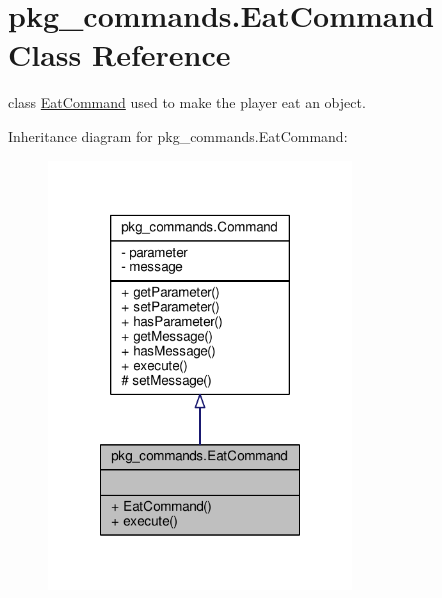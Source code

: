 \hypertarget{classpkg__commands_1_1EatCommand}{\section{pkg\-\_\-commands.\-Eat\-Command Class Reference}
\label{classpkg__commands_1_1EatCommand}
}


class \hyperlink{classpkg__commands_1_1EatCommand}{Eat\-Command} used to make the player eat an object.  




Inheritance diagram for pkg\-\_\-commands.\-Eat\-Command\-:\nopagebreak
\begin{figure}[H]
\begin{center}
\leavevmode
\includegraphics[width=228pt]{classpkg__commands_1_1EatCommand__inherit__graph}
\end{center}
\end{figure}


